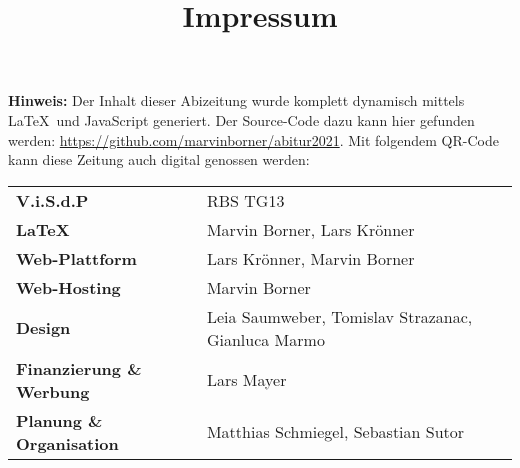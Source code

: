 \title{Impressum}


\textbf{Hinweis:} Der Inhalt dieser Abizeitung wurde komplett dynamisch mittels \LaTeX\  und JavaScript generiert. Der Source-Code dazu kann hier gefunden werden: \url{https://github.com/marvinborner/abitur2021}. Mit folgendem QR-Code kann diese Zeitung auch digital genossen werden:

\begin{center}
\end{center}

\begin{table}[b]
	\begin{tabular}{ l l }
		\textbf{V.i.S.d.P}               & RBS TG13                                           \\ %
		\textbf{\LaTeX}                  & Marvin Borner, Lars Krönner                        \\
		\textbf{Web-Plattform}           & Lars Krönner, Marvin Borner                        \\
		\textbf{Web-Hosting}             & Marvin Borner                                      \\
		\textbf{Design}                  & Leia Saumweber, Tomislav Strazanac, Gianluca Marmo \\
		\textbf{Finanzierung \& Werbung} & Lars Mayer                                         \\
		\textbf{Planung \& Organisation} & Matthias Schmiegel, Sebastian Sutor                \\
	\end{tabular}
\end{table}
